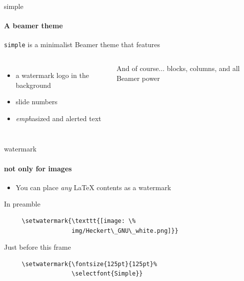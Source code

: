 \documentclass{beamer}
\title{}
\subtitle{}
\date{\today}
\author{}
\institute{\url{sfedu.ru}}
\begin{document}
\maketitle

\begin{frame}{simple}
  \framesubtitle{A beamer theme}

  \texttt{simple} is a minimalist Beamer theme that features

  \begin{columns}
      \begin{itemize}
        \item a \alert{watermark} logo in the background
        \item slide \alert{numbers}
        \item \emph{emph}asized and \alert{alert}ed text
      \end{itemize}

      \begin{block}{And of course...}
         blocks, columns, and all Beamer power
      \end{block}
  \end{columns}
  
\end{frame}



\setwatermark{\fontsize{125pt}{125pt}\selectfont{}}

\begin{frame}[fragile]{watermark}
  \framesubtitle{not only for images}

  \begin{itemize}
    \item You can place \emph{any} \LaTeX{} \alert{contents} as a watermark
  \end{itemize}

  \begin{block}{In preamble}
    \begin{verbatim}
     \setwatermark{\texttt{[image: \%
                   img/Heckert\_GNU\_white.png]}}
    \end{verbatim}
  \end{block}

  \begin{block}{Just before this frame}
    \begin{verbatim}
     \setwatermark{\fontsize{125pt}{125pt}%
                   \selectfont{Simple}}
    \end{verbatim}
  \end{block}


\end{frame}
\end{document}
